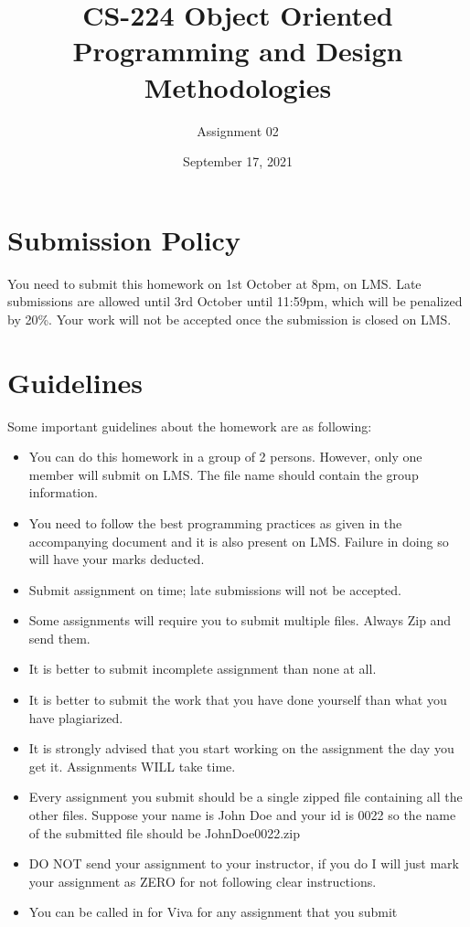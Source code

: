 \documentclass[a4paper,12pt]{article}
\begin{document}
\title{CS-224 Object Oriented Programming and Design Methodologies }
\author{Assignment 02}
\date{September 17, 2021}
\maketitle
\section{Submission Policy}
You need to submit this homework on  {\color{blue}1st October at 8pm}, on LMS. Late submissions are allowed until {\color{red} 3rd October until 11:59pm}, which will be penalized by 20\%. Your work will not be accepted once the submission is closed on LMS.

\section{Guidelines}
Some important guidelines about the homework are as following:
\begin{itemize}
	\item You can do this homework in a group of 2 persons. However, only one member will submit on LMS. The file name should contain the group information.
	      
	\item You need to follow the best programming practices as given in the accompanying document and it is also present on LMS. Failure in doing so will have your marks deducted.
	\item Submit assignment on time; late submissions will not be accepted.
	\item Some assignments will require you to submit multiple files. Always Zip and send them.
	\item It is better to submit incomplete assignment than none at all.
	\item It is better to submit the work that you have done yourself than what you have plagiarized.
	\item It is strongly advised that you start working on the assignment the day you get it. Assignments WILL take time.
	\item Every assignment you submit should be a single zipped file containing all the other files. Suppose your name is John Doe and your id is 0022 so the name of the submitted file should be JohnDoe0022.zip
	\item DO NOT send your assignment to your instructor, if you do I will just mark your assignment as ZERO for not following clear instructions.
	\item You can be called in for Viva for any assignment that you submit
\end{itemize}
\end{document}
